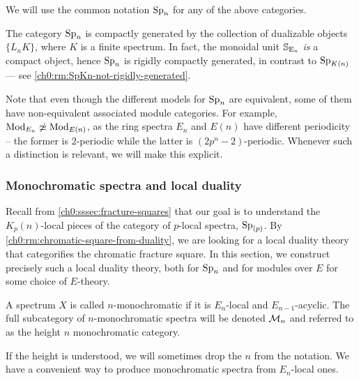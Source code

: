\begin{notation}
    We will use the common notation $\sp\np$ for any of the above categories. 
\end{notation}

\begin{remark}
    The category $\Sp\np$ is compactly generated by the collection of dualizable objects $\{L_n K\}$, where $K$ is a finite spectrum. In fact, the monoidal unit $\S_{\En}$ \emph{is} a compact object, hence $\Sp\np$ is rigidly compactly generated, in contrast to $\SpK$ --- see \cref{ch0:rm:SpKn-not-rigidly-generated}.
\end{remark}

\begin{remark}
    Note that even though the different models for $\sp\np$ are equivalent, some of them have non-equivalent associated module categories. For example, $\Mod_{E_n}\not \simeq \Mod_{E(n)}$, as the ring spectra $E_n$ and $E(n)$ have different periodicity -- the former is $2$-periodic while the latter is $(2p^n-2)$-periodic. Whenever such a distinction is relevant, we will make this explicit. 
\end{remark}





\subsubsection{Monochromatic spectra and local duality}
\label{ch0:ssec:monochromatic-duality}

Recall from \cref{ch0:sssec:fracture-squares} that our goal is to understand the $K_p(n)$-local pieces of the category of $p$-local spectra, $\sp_{(p)}$. By \cref{ch0:rm:chromatic-square-from-duality}, we are looking for a local duality theory that categorifies the chromatic fracture square. In this section, we construct precisely such a local duality theory, both for $\sp\np$ and for modules over $E$ for some choice of $E$-theory. 



\begin{definition}
    \label{ch0:def:monochromatic-spectrum}
    A spectrum $X$ is called { $n$-monochromatic} if it is $E_n$-local and $E_{n-1}$-acyclic. The full subcategory of $n$-monochromatic spectra will be denoted { $\M\np$} and referred to as the height $n$ monochromatic category.
\end{definition}

If the height is understood, we will sometimes drop the $n$ from the notation. We have a convenient way to produce monochromatic spectra from $E_n$-local ones. 

